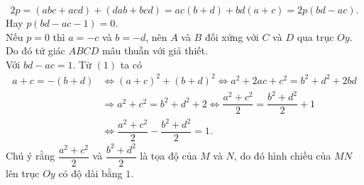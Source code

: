 \begin{ex}
{{}$$2p=(abc+acd)+(dab+bcd)=ac(b+d)+bd(a+c)=2p(bd-ac).$$
Hay $p(bd-ac-1)=0$.\\
Nếu $p=0$ thì $a=-c$ và $b=-d$, nên $A$ và $B$ đối xứng với $C$ và $D$ qua trục $Oy$. Do đó tứ giác $ABCD$ mâu thuẫn với giả thiết.\\
Với $bd-ac=1$. Từ $(1)$ ta có \begin{align*}
	a+c=-(b+d)&\Leftrightarrow (a+c)^2+(b+d)^2\Leftrightarrow a^2+2ac+c^2=b^2+d^2+2bd\\
	&\Rightarrow a^2+c^2=b^2+d^2+2\Leftrightarrow \dfrac{a^2+c^2}{2}=\dfrac{b^2+d^2}{2}+1\\
	&\Leftrightarrow \dfrac{a^2+c^2}{2}-\dfrac{b^2+d^2}{2}=1.
\end{align*}
Chú ý rằng $\dfrac{a^2+c^2}{2}$ và $\dfrac{b^2+d^2}{2}$ là tọa độ của $M$ và $N$, do đó hình chiều của $MN$ lên trục $Oy$ có độ dài bằng $1$.

}
\end{ex}

